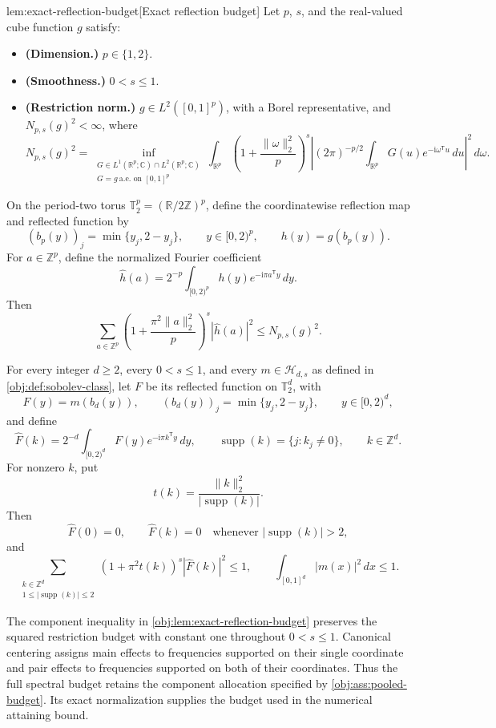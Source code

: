 \begin{lemmav}{lem:exact-reflection-budget}[Exact reflection budget]
Let \(p\), \(s\), and the real-valued cube function \(g\) satisfy:
\begin{itemize}
\item \textbf{(Dimension.)} \(p\in\{1,2\}\).
\item \textbf{(Smoothness.)} \(0<s\leq1\).
\item \textbf{(Restriction norm.)} \(g\in L^2([0,1]^p)\), with a Borel representative, and \(N_{p,s}(g)^2<\infty\), where
\[
N_{p,s}(g)^2
=
\inf_{\substack{G\in L^1(\mathbb R^p;\mathbb C)\cap L^2(\mathbb R^p;\mathbb C)\\
G=g\ \text{a.e. on }[0,1]^p}}
\int_{\mathbb R^p}
\left(1+\frac{\|\omega\|_2^2}{p}\right)^s
\left|
(2\pi)^{-p/2}
\int_{\mathbb R^p}G(u)e^{-\mathrm i\omega^{\mathsf T}u}\,du
\right|^2\,d\omega .
\]
\end{itemize}
On the period-two torus \(\mathbb T_2^p=(\mathbb R/2\mathbb Z)^p\), define the coordinatewise reflection map and reflected function by
\[
(b_p(y))_j=\min\{y_j,2-y_j\},
\qquad y\in[0,2)^p,
\qquad h(y)=g(b_p(y)).
\]
For \(a\in\mathbb Z^p\), define the normalized Fourier coefficient
\[
\widehat h(a)
=
2^{-p}\int_{[0,2)^p}h(y)e^{-\mathrm i\pi a^{\mathsf T}y}\,dy .
\]
Then
\[
\sum_{a\in\mathbb Z^p}
\left(1+\frac{\pi^2\|a\|_2^2}{p}\right)^s
|\widehat h(a)|^2
\leq N_{p,s}(g)^2 .
\]

For every integer \(d\geq2\), every \(0<s\leq1\), and every \(m\in\mathcal H_{d,s}\) as defined in \cref{obj:def:sobolev-class}, let \(F\) be its reflected function on \(\mathbb T_2^d\), with
\[
F(y)=m(b_d(y)),
\qquad
(b_d(y))_j=\min\{y_j,2-y_j\},
\qquad y\in[0,2)^d,
\]
and define
\[
\widehat F(k)
=
2^{-d}\int_{[0,2)^d}F(y)e^{-\mathrm i\pi k^{\mathsf T}y}\,dy,
\qquad
\operatorname{supp}(k)=\{j:k_j\neq0\},
\qquad k\in\mathbb Z^d.
\]
For nonzero \(k\), put
\[
t(k)=\frac{\|k\|_2^2}{|\operatorname{supp}(k)|}.
\]
Then
\[
\widehat F(0)=0,
\qquad
\widehat F(k)=0
\quad\text{whenever }|\operatorname{supp}(k)|>2,
\]
and
\[
\sum_{\substack{k\in\mathbb Z^d\\1\leq|\operatorname{supp}(k)|\leq2}}
(1+\pi^2t(k))^s|\widehat F(k)|^2\leq1,
\qquad
\int_{[0,1]^d}|m(x)|^2\,dx\leq1.
\]
\end{lemmav}

The component inequality in \cref{obj:lem:exact-reflection-budget} preserves the squared restriction budget with constant one throughout \(0<s\leq1\). Canonical centering assigns main effects to frequencies supported on their single coordinate and pair effects to frequencies supported on both of their coordinates. Thus the full spectral budget retains the component allocation specified by \cref{obj:ass:pooled-budget}. Its exact normalization supplies the budget used in the numerical attaining bound.

